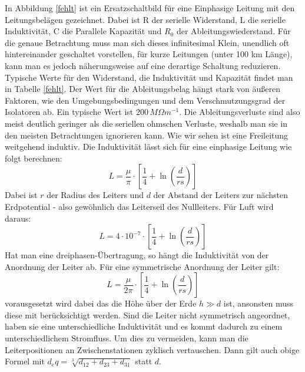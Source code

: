 \documentclass[10pt,a4paper]{article}
\begin{document}
In Abbildung \ref{fehlt} ist ein Ersatzschaltbild für eine Einphasige Leitung mit den Leitungsbelägen gezeichnet. Dabei ist R der serielle Widerstand, L die serielle Induktivität, C die Parallele Kapazität und $R_0$ der Ableitungswiederstand. Für die genaue Betrachtung muss man sich dieses infinitesimal Klein, unendlich oft hintereinander geschaltet vorstellen, für kurze Leitungen (unter 100 km Länge), kann man es jedoch näherungsweise auf eine derartige Schaltung reduzieren.
Typische Werte für den Widerstand, die Induktivität und Kapazität findet man in Tabelle \ref{fehlt}. Der Wert für die Ableitungsbelag hängt stark von äußeren Faktoren, wie den Umgebungsbedingungen und dem Verschmutzungsgrad der Isolatoren ab. Ein typische Wert ist $200\,M\Omega m^{-1}$.\cite{Harrison} Die Ableitungsverluste sind also meist deutlich geringer als die seriellen ohmschen Verluste, weshalb man sie in den meisten Betrachtungen ignorieren kann.
Wie wir sehen ist eine Freileitung weitgehend induktiv. Die Induktivität lässt sich für eine einphasige Leitung wie folgt berechnen:
\begin{equation}
L = \frac{\mu}{\pi} \cdot \left[ \frac{1}{4} + \ln\left(\frac{d}{rs}\right) \right]
\end{equation}
Dabei ist $r$ der Radius des Leiters und $d$ der Abstand der Leiters zur nächsten Erdpotential - also gewöhnlich das Leiterseil des Nullleiters. Für Luft wird daraus:
\begin{equation}
L = 4 \cdot 10^{-7} \cdot \left[ \frac{1}{4} + \ln\left(\frac{d}{rs}\right) \right]
\end{equation}
Hat man eine dreiphasen-Übertragung, so hängt die Induktivität von der Anordnung der Leiter ab. Für eine symmetrische Anordnung der Leiter gilt:
\begin{equation}
L = \frac{\mu}{2\pi} \cdot \left[ \frac{1}{4} + \ln\left(\frac{d}{rs}\right) \right]
\end{equation}
vorausgesetzt wird dabei das die Höhe über der Erde $h\gg d$ ist, ansonsten muss diese mit berücksichtigt werden.
Sind die Leiter nicht symmetrisch angeordnet, haben sie eine unterschiedliche Induktivität und es kommt dadurch zu einem unterschiedlichem Stromfluss.
Um dies zu vermeiden, kann man die Leiterpositionen an Zwischenstationen zyklisch vertauschen. Dann gilt auch obige Formel mit $d_eq = \sqrt[3]{d_{12}+d_{23}+d_{31}}$ statt $d$.

\end{document}
